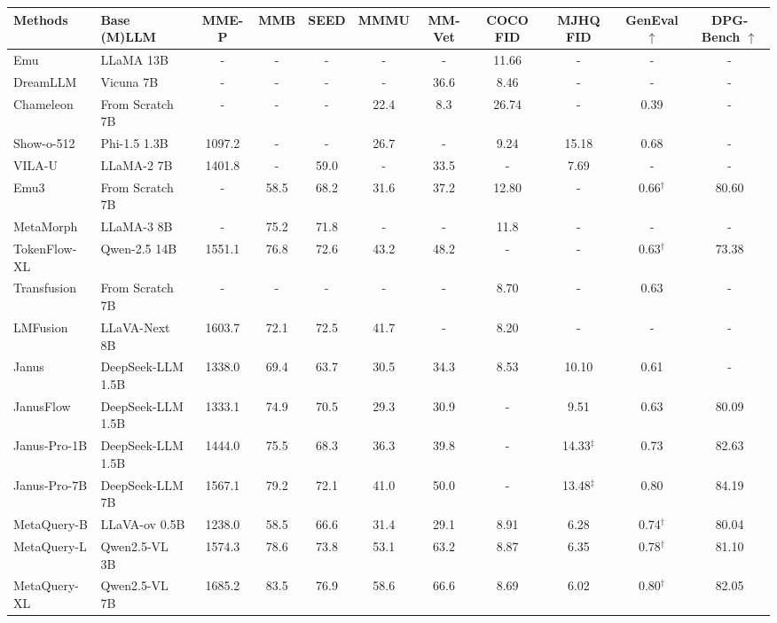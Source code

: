 \documentclass[]{fairmeta}
\newcommand\our{{\fontfamily{lmtt}\selectfont MetaQuery}\xspace}
\begin{document}
\begin{table}[!t]
    \scriptsize
    \centering
    \setlength{\tabcolsep}{4pt}
    \renewcommand{\arraystretch}{1.2}
    \begin{tabular}{llccccc|cccc}
        \textbf{Methods} & \textbf{Base (M)LLM} & \textbf{MME-P} & \textbf{MMB} & \textbf{SEED} & \textbf{MMMU} & \textbf{MM-Vet} & \textbf{COCO FID } & \textbf{MJHQ FID } & \textbf{GenEval $\uparrow$} & \textbf{DPG-Bench $\uparrow$} \\
        \midrule        
 Emu & LLaMA 13B & - & - & - & - & - & 11.66 & - & - & - \\
 DreamLLM & Vicuna 7B & - & - & - & - & 36.6 & 8.46 & - & - & - \\
 Chameleon & From Scratch 7B & - & - & - & 22.4 & 8.3 & 26.74 & - & 0.39 & - \\
 Show-o-512 & Phi-1.5 1.3B & 1097.2 & - & - & 26.7 & - & 9.24 & 15.18 & 0.68 & - \\
 VILA-U & LLaMA-2 7B & 1401.8 & - & 59.0 & - & 33.5 & - & 7.69 & - & - \\
 Emu3 & From Scratch 7B & - & 58.5 & 68.2 & 31.6 & 37.2 & 12.80 & - & 0.66$^\dagger$ & 80.60 \\
 MetaMorph & LLaMA-3 8B & - & 75.2 & 71.8 & - & - & 11.8 & - & - & - \\
 TokenFlow-XL & Qwen-2.5 14B & 1551.1 & 76.8 & 72.6 & 43.2 & 48.2 & - & - & 0.63$^\dagger$ & 73.38 \\
 Transfusion & From Scratch 7B & - & - & - & - & - & 8.70 & - & 0.63 & - \\
 LMFusion & LLaVA-Next 8B & 1603.7 & 72.1 & 72.5 & 41.7 & - & \cellcolor{green!10}8.20 & - & - & - \\
 Janus & DeepSeek-LLM 1.5B & 1338.0 & 69.4 & 63.7 & 30.5 & 34.3 & 8.53 & 10.10 & 0.61 & - \\
 JanusFlow & DeepSeek-LLM 1.5B & 1333.1 & 74.9 & 70.5 & 29.3 & 30.9 & - & 9.51 & 0.63 & 80.09 \\
 Janus-Pro-1B & DeepSeek-LLM 1.5B & 1444.0 & 75.5 & 68.3 & 36.3 & 39.8 & - & 14.33$^\ddagger$ & 0.73 & 82.63 \\
 Janus-Pro-7B & DeepSeek-LLM 7B & 1567.1 & 79.2 & 72.1 & 41.0 & 50.0 & - & 13.48$^\ddagger$ & \cellcolor{green!10}0.80 & \cellcolor{green!10}84.19 \\
        \midrule
        \our-B& LLaVA-ov 0.5B & 1238.0 & 58.5 & 66.6 & 31.4 & 29.1 & 8.91 & 6.28 & 0.74$^\dagger$ & 80.04 \\
        \our-L& Qwen2.5-VL 3B & 1574.3 & 78.6 & 73.8 & 53.1 & 63.2 & 8.87 & 6.35 & 0.78$^\dagger$ & 81.10 \\
        \our-XL& Qwen2.5-VL 7B & \cellcolor{green!10}1685.2 & \cellcolor{green!10}83.5 & \cellcolor{green!10}76.9 & \cellcolor{green!10}58.6 & \cellcolor{green!10}66.6 & 8.69 & \cellcolor{green!10}6.02 & 0.80$^\dagger$ & 82.05 \\
        

\end{tabular}
\end{table}
\end{document}
